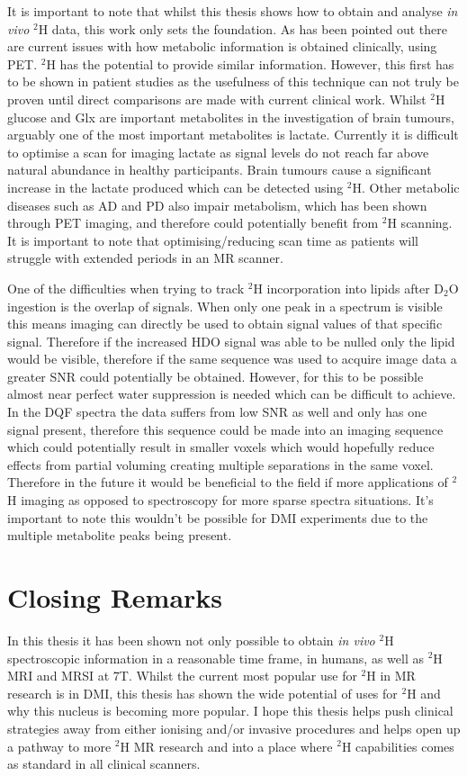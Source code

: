 It is important to note that whilst this thesis shows how to obtain and analyse \textit{in vivo} $^2$H data, this work only sets the foundation. As has been pointed out there are current issues with how metabolic information is obtained clinically, using \ac{PET}. $^2$H has the potential to provide similar information. However, this first has to be shown in patient studies as the usefulness of this technique can not truly be proven until direct comparisons are made with current clinical work. Whilst $^2$H glucose and Glx are important metabolites in the investigation of brain tumours, arguably one of the most important metabolites is lactate. Currently it is difficult to optimise a scan for imaging lactate as signal levels do not reach far above natural abundance in healthy participants. Brain tumours cause a significant increase in the lactate produced which can be detected using $^2$H. Other metabolic diseases such as \ac{AD} and \ac{PD} also impair metabolism, which has been shown through \ac{PET} imaging\cite{Shokouhi2014ImagingTomography, Meles2017MetabolicDisease}, and therefore could potentially benefit from $^2$H scanning. It is important to note that optimising/reducing scan time as patients will struggle with extended periods in an MR scanner.

One of the difficulties when trying to track $^2$H incorporation into lipids after D$_2$O ingestion is the overlap of signals. When only one peak in a spectrum is visible this means imaging can directly be used to obtain signal values of that specific signal. Therefore if the increased \ac{HDO} signal was able to be nulled only the lipid would be visible, therefore if the same sequence was used to acquire image data a greater \ac{SNR} could potentially be obtained. However, for this to be possible almost near perfect water suppression is needed which can be difficult to achieve. In the \ac{DQF} spectra the data suffers from low \ac{SNR} as well and only has one signal present, therefore this sequence could be made into an imaging sequence which could potentially result in smaller voxels which would hopefully reduce effects from partial voluming creating multiple separations in the same voxel. Therefore in the future it would be beneficial to the field if more applications of $^2$H imaging as opposed to spectroscopy for more sparse spectra situations. It's important to note this wouldn't be possible for \ac{DMI} experiments due to the multiple metabolite peaks being present.

\section{Closing Remarks}

In this thesis it has been shown not only possible to obtain \textit{in vivo} $^2$H spectroscopic information in a reasonable time frame, in humans, as well as $^2$H \ac{MRI} and \ac{MRSI} at 7T. Whilst the current most popular use for $^2$H in MR research is in \ac{DMI}, this thesis has shown the wide potential of uses for $^2$H and why this nucleus is becoming more popular. I hope this thesis helps push clinical strategies away from either ionising and/or invasive procedures and helps open up a pathway to more $^2$H MR research and into a place where $^2$H capabilities comes as standard in all clinical scanners.